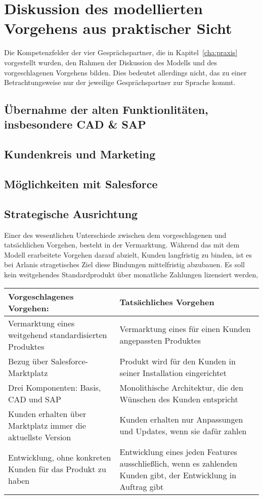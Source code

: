 \section{Diskussion des modellierten Vorgehens aus praktischer Sicht}
\label{cha:diskussion}
\begin{comment}
Im vorletzten Abschnitt diskutieren Sie Ihre Ergebnisse und stellen den Beitrag 
für die Praxis und für die Forschung dar. Gehen Sie auch auf die Einschränkungen 
Ihrer Arbeit ein.
\end{comment}
Die Kompetenzfelder der vier 
Gesprächspartner, die in Kapitel~\ref{cha:praxis} vorgestellt wurden, den 
Rahmen der Diskussion des Modells und des vorgeschlagenen Vorgehens 
bilden. Dies bedeutet allerdings nicht, das zu einer Betrachtungsweise nur der 
jeweilige Gesprächspartner zur Sprache kommt.
\subsection{Übernahme der alten Funktionlitäten, insbesondere CAD \& SAP}
\subsection{Kundenkreis und Marketing}
\subsection{Möglichkeiten mit Salesforce}
\subsection{Strategische Ausrichtung}
Einer des wesentlichen Unterschiede zwischen dem vorgeschlagenen und 
tatsächlichen Vorgehen, besteht in der Vermarktung. Während das mit dem Modell 
erarbeitete Vorgehen darauf abzielt, Kunden langfristig zu binden, ist es bei 
Arlanis stragetisches Ziel diese Bindungen mittelfristig abzubauen. Es soll 
kein weitgehendes Standardprodukt über monatliche Zahlungen lizensiert werden, 

\begin{tabular}{|p{}|p{}|}
\hline
\textbf{Vorgeschlagenes Vorgehen:} & \textbf{Tatsächliches Vorgehen} \\
\hline
Vermarktung eines weitgehend standardisierten Produktes & Vermarktung eines für 
einen Kunden angepassten Produktes \\
\hline
Bezug über Salesforce-Marktplatz & Produkt wird für den Kunden in 
seiner Installation eingerichtet \\
\hline
Drei Komponenten: Basis, CAD und SAP & Monolithische Architektur, die den 
Wünschen des Kunden entspricht \\
\hline
Kunden erhalten über Marktplatz immer die aktuellste Version & Kunden erhalten 
nur Anpassungen und Updates, wenn sie dafür zahlen \\
\hline
Entwicklung, ohne konkreten Kunden für das Produkt zu haben & Entwicklung 
eines jeden Features ausschließlich, wenn es zahlenden Kunden gibt, der 
Entwicklung in Auftrag gibt \\
\hline
\end{tabular}
